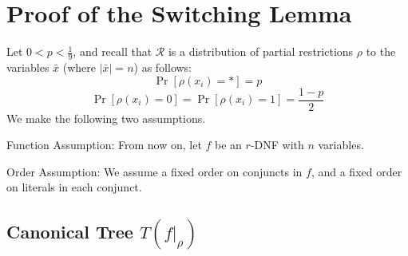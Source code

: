 % 
% 
% 
% 
% 
% 
% 
% 
% 
% 
% 
% 
% 
% 
% 
% 
 


\section{Proof of the Switching Lemma}

Let \( 0 < p < \frac{1}{9} \), and recall that  \(\mathcal{R}\) is a distribution of partial restrictions
\(\rho\) to the variables \( \bar{x} \) (where \( |\bar{x}| = n \)) as follows:
\[
\Pr[\rho(x_i) = *] = p
\]
\[
\Pr[\rho(x_i) = 0] = \Pr[\rho(x_i) = 1] = \frac{1 - p}{2}
\]
We make the following two assumptions.

Function Assumption: From now on, let \( f \) be an $r$-DNF with \( n \) variables.

Order Assumption:  We assume a fixed order on conjuncts in \( f \),
and a fixed order on literals in each conjunct.

\subsection{Canonical Tree \( T(f|_{\rho}) \)}

